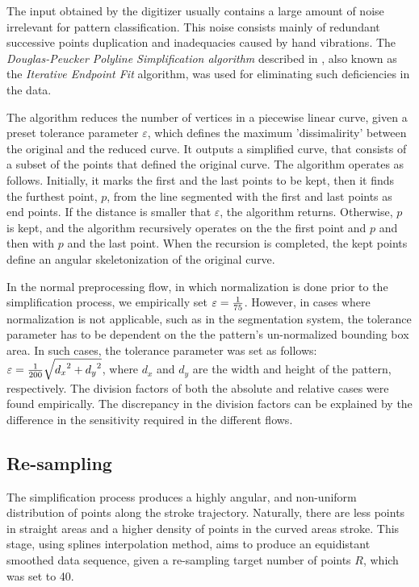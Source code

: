 \iftoggle{edit-mode}{\hspace{0pt}\marginpar{Introduction}}{}
The input obtained by the digitizer usually contains a large amount of noise irrelevant for pattern classification. 
This noise consists mainly of redundant successive points duplication and inadequacies caused by hand vibrations. 
The \emph{Douglas-Peucker Polyline Simplification algorithm} described in \cite{douglas1973algorithms}, also known as the \emph{Iterative Endpoint Fit} algorithm, was used for eliminating such deficiencies in the data. 

\iftoggle{edit-mode}{\hspace{0pt}\marginpar{The Douglas-Peucker algorithm}}{}
The algorithm reduces the number of vertices in a piecewise linear curve, given a preset tolerance parameter $\varepsilon$, which defines the maximum 'dissimalirity' between the original and the reduced curve.
It outputs a simplified curve, that consists of a subset of the points that defined the original curve.
The algorithm operates as follows. 
Initially, it marks the first and the last points to be kept, then it finds the furthest point, $p$, from the line segmented with the first and last points as end points.
If the distance is smaller that $\varepsilon$, the algorithm returns. 
Otherwise, $p$ is kept, and the algorithm recursively operates on the the first point and $p$ and then with $p$ and the last point.
When the recursion is completed, the kept points define an angular skeletonization of the original curve.

\iftoggle{edit-mode}{\hspace{0pt}\marginpar{Different tolerance parameters}}{}
In the normal preprocessing flow, in which normalization is done prior to the simplification process, we empirically set $\varepsilon  = {1 \over 75}$.
However, in cases where normalization is not applicable, such as in the segmentation system, the tolerance parameter has to be dependent on the the pattern's un-normalized bounding box area. 
In such cases, the tolerance parameter was set as follows: $\varepsilon  = {1 \over {200}}\sqrt {{d_x}^2 + {d_y}^2}$, where $d_x$ and $d_y$ are the width and height of the pattern, respectively. 
The division factors of both the absolute and relative cases were found empirically. 
The discrepancy in the division factors can be explained by the difference in the sensitivity required in the different flows. 

\subsection{Re-sampling}
\iftoggle{edit-mode}{\hspace{0pt}\marginpar{Goal}}{}
The simplification process produces a highly angular, and non-uniform distribution of points along the stroke trajectory.
Naturally, there are less points in straight areas and a higher density of points in the curved areas stroke. 
This stage, using splines interpolation method, aims to produce an equidistant smoothed data sequence, given a re-sampling target number of points $R$, which was set to 40. 


